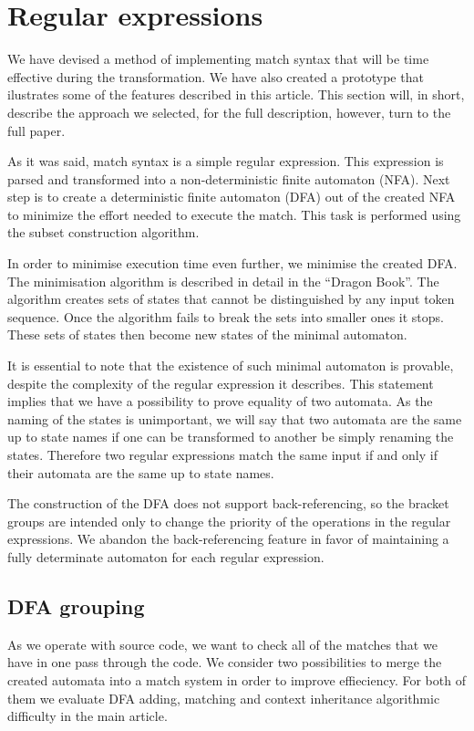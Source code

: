 \section{\label{sec:regexps}Regular expressions}

We have devised a method of implementing match syntax that will be time
effective during the transformation. We have also created a prototype that
ilustrates some of the features described in this article. This section will,
in short, describe the approach we selected, for the full description, however,
turn to the full paper.

As it was said, match syntax is a simple regular expression. This expression is
parsed and transformed into a non-deterministic finite automaton (NFA). Next
step is to create a deterministic finite automaton (DFA) out of the created NFA
to minimize the effort needed to execute the match. This task is performed
using the subset construction algorithm.

In order to minimise execution time even further, we minimise the created DFA.
The minimisation algorithm is described in detail in the ``Dragon
Book''\cite{dragon-book}. The algorithm creates sets of states that cannot be
distinguished by any input token sequence. Once the algorithm fails to break
the sets into smaller ones it stops. These sets of states then become new
states of the minimal automaton.

It is essential to note that the existence of such minimal automaton is
provable, despite the complexity of the regular expression it describes. This
statement implies that we have a possibility to prove equality of two automata.
As the naming of the states is unimportant, we will say that two automata are
the same up to state names if one can be transformed to another be simply
renaming the states. Therefore two regular expressions match the same input if
and only if their automata are the same up to state names.

The construction of the DFA does not support back-referencing, so the bracket
groups are intended only to change the priority of the operations in the
regular expressions. We abandon the back-referencing feature in favor of
maintaining a fully determinate automaton for each regular expression.

\subsection{DFA grouping}
As we operate with source code, we want to check all of the matches that we
have in one pass through the code. We consider two possibilities to merge the
created automata into a match system in order to improve effieciency. For both
of them we evaluate DFA adding, matching and context inheritance algorithmic
difficulty in the main article.

